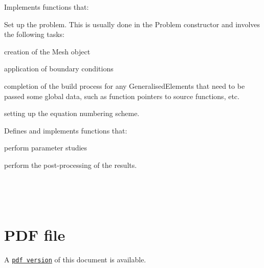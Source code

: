 \begin{center}
\begin{TabularC}{1}
\begin{center}
\begin{TabularC}{1}
\begin{DoxyItemize}
\item Implements functions that\-:
\begin{DoxyItemize}
\item Set up the problem. This is usually done in the {\ttfamily Problem} constructor and involves the following tasks\-:
\begin{DoxyItemize}
\item creation of the {\ttfamily Mesh} object
\item application of boundary conditions
\item completion of the build process for any {\ttfamily Generalised\-Elements} that need to be passed some global data, such as function pointers to source functions, etc.
\item setting up the equation numbering scheme.
\end{DoxyItemize}
\end{DoxyItemize}
\item Defines and implements functions that\-:
\begin{DoxyItemize}
\item perform parameter studies
\item perform the post-\/processing of the results.   
\end{DoxyItemize}
\end{DoxyItemize}\\
\end{TabularC}
\end{center}    \\
\end{TabularC}
\end{center} 



 





 

 \hypertarget{index_pdf}{}\section{P\-D\-F file}\label{index_pdf}
A \href{../latex/refman.pdf}{\tt pdf version} of this document is available. 